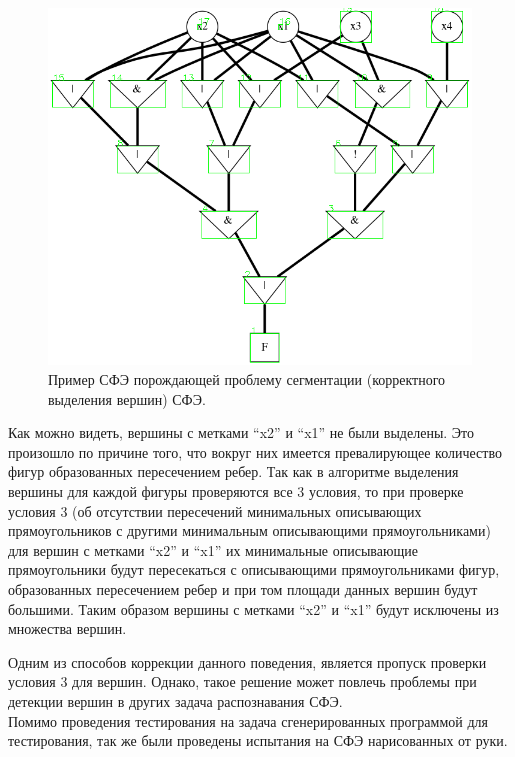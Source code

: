 \documentclass[makeidx, a4paper, 14pt]{extarticle}
\begin{document}
\begin{figure}[H]
    \centering
    \includegraphics[scale=0.5]{bad_segmentation_nodes.png}
    \caption{Пример СФЭ порождающей проблему сегментации (корректного выделения вершин) СФЭ.}
    \label{fig:bad_segmentation_nodes}
\end{figure}

Как можно видеть, вершины с метками ``x2'' и ``x1'' не были выделены. Это произошло по причине того,
что вокруг них имеется превалирующее количество фигур образованных пересечением ребер. Так как в алгоритме выделения вершины для каждой фигуры
проверяются все 3 условия, то при проверке условия 3 (об отсутствии пересечений минимальных описывающих прямоугольников с другими
минимальным описывающими прямоугольниками) для вершин с метками ``x2'' и ``x1'' их минимальные описывающие прямоугольники будут пересекаться с описывающими прямоугольниками фигур, образованных пересечением ребер и при том
площади данных вершин будут большими. Таким образом вершины с метками ``x2'' и ``x1'' будут исключены из множества вершин.

Одним из способов коррекции данного поведения, является пропуск проверки условия 3 для вершин.
Однако, такое решение может повлечь проблемы при детекции вершин в других задача распознавания СФЭ. \\

Помимо проведения тестирования на задача сгенерированных программой для тестирования, так же были проведены испытания
на СФЭ нарисованных от руки.
\end{document}
